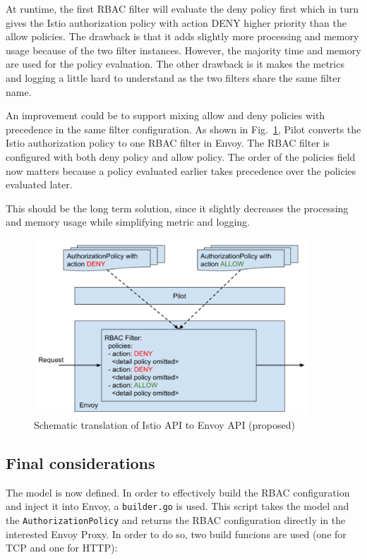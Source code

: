 At runtime, the first RBAC filter will evaluate the deny policy first which in turn gives the Istio authorization policy with action DENY higher priority than the allow policies.
The drawback is that it adds slightly more processing and memory usage because of the two filter instances. However, the majority time and memory are used for the policy evaluation.
The other drawback is it makes the metrics and logging a little hard to understand as the two filters share the same filter name.

An improvement could be to support mixing allow and deny policies with precedence in the same filter configuration. As shown in Fig.~\ref{fig:rbac-filter2}, Pilot converts the Istio authorization policy to one RBAC filter in Envoy. The RBAC filter is configured with both deny policy and allow policy. The order of the policies field now matters because a policy evaluated earlier takes precedence over the policies evaluated later.

This should be the long term solution, since it slightly decreases the processing and memory usage while simplifying metric and logging.


\begin{figure}[ht]
    \centering
    \includegraphics[width=0.92\textwidth]{chapters/images/chp3/rbac-filter2.png}
    \caption{Schematic translation of Istio API to Envoy API (proposed)}
    \label{fig:rbac-filter2}
\end{figure}

\subsection{Final considerations}
The model is now defined. In order to effectively build the RBAC configuration and inject it into Envoy, a \texttt{builder.go} is used. This script takes the model and the \texttt{AuthorizationPolicy} and returns the RBAC configuration directly in the interested Envoy Proxy. In order to do so, two build funcions are used (one for TCP and one for HTTP):


